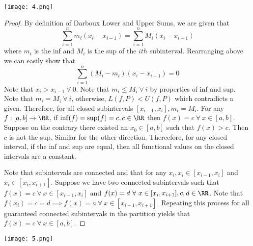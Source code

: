 \documentclass[12pt]{scrartcl}
\begin{document}
\newpage

\texttt{[image: 4.png]}

\begin{proof}

\hfill

By definition of Darboux Lower and Upper Sums, we are given that 
\[\sum_{i=1}^n m_i(x_i - x_{i-1}) = \sum_{i=1}^n M_i(x_i - x_{i-1})\]
where $m_i$ is the inf and $M_i$ is the sup of the $ith$ subinterval. Rearranging above we can easily show that 
\[\sum_{i=1}^n (M_i - m_i)(x_i - x_{i-1}) = 0\]
Note that $x_i > x_{i-1} \ \forall \ 0$. Note that $m_i \leq M_i \ \forall \ i$ by properties of 
inf and sup. Note that $m_i = M_i \ \forall \ i$, otherwise, $L(f, P) < U(f, P)$ which contradicts a 
given. Therefore, for all closed subintervals $[x_{i-1}, x_i], m_i = M_i$. For any $f:[a,b] \to \RR$, 
if $\inf(f) = \sup(f) = c, c \in \RR$ then $f(x) = c \ \forall \ x \in [a,b]$. Suppose on the contrary there existed an 
$x_0 \in [a,b]$ such that $f(x) > c$. Then $c$ is not the sup. Similar for the other direction. Thereefore, for 
any closed interval, if the inf and sup are equal, then all functional values on the closed intervals are a constant.

\hfill

Note that subintervals are connected and that for any $x_i, x_i \in [x_{i-1}, x_i]$ and $x_i \in [x_i, x_{i+1}]$.
Suppose we have two connected subintervals such that 
 $f(x) = c \ \forall \ x \in [x_{i-1}, x_i]$ and $f(x) = d \ \forall \ x \in [x_i, x_{i+1}], c, d \in \RR$.
Note that $f(x_i) = c = d \implies f(x) = a \ \forall \ x \in [x_{i-1}, x_{i+1}]$. Repeating this process 
for all guaranteed connected subintervals in the partition yields that $f(x) = c \ \forall \ x \in [a, b]$. 

\end{proof}

\newpage

\texttt{[image: 5.png]}
\end{document}
